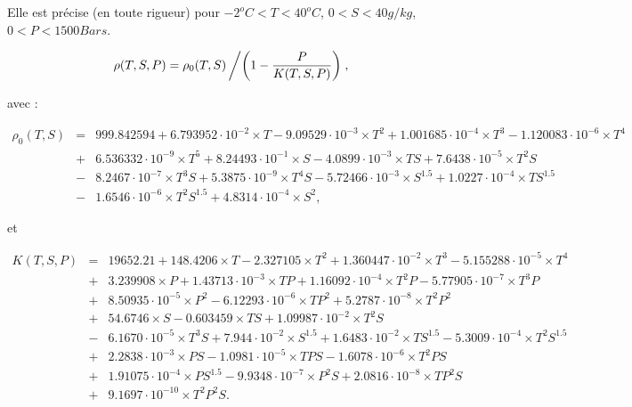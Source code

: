 Elle est précise (en toute rigueur) pour $-2^oC<T < 40^o C$, $0<S<40g/kg$, 
$0<P<1500 Bars$.
{
\tiny

$$
\rho(T,S,P) = \rho_0(T,S) \left/ \left( 1 - \frac{P}{K(T,S,P)} \right) \right.,
$$

avec :

\begin{eqnarray*}
\rho_0(T,S) &=& 999.842594+6.793952\cdot 10^{-2} \times T-9.09529\cdot 10^{-3} \times T^2+1.001685\cdot 10^{-4} \times T^3 -1.120083\cdot 10^{-6} \times T^4 \\
            &+& 6.536332\cdot 10^{-9} \times T^5+8.24493\cdot 10^{-1} \times S-4.0899\cdot 10^{-3} \times T S+7.6438\cdot 10^{-5} \times T^2 S \\
	    &-&8.2467\cdot 10^{-7} \times T^3 S + 5.3875\cdot 10^{-9} \times T^4 S-5.72466\cdot 10^{-3} \times S^{1.5}+1.0227\cdot 10^{-4} \times T S^{1.5}\\
	    &-&1.6546\cdot 10^{-6} \times T^2 S^{1.5}+4.8314\cdot 10^{-4} \times S^2, 
\end{eqnarray*}

et 

\begin{eqnarray*}
K(T,S,P) &=& 19652.21+148.4206 \times T-2.327105 \times T^2+1.360447\cdot 10^{-2} \times T^3-5.155288\cdot 10^{-5} \times T^4 \\
         &+&3.239908 \times P+1.43713\cdot 10^{-3} \times T P+1.16092\cdot 10^{-4} \times T^2 P-5.77905\cdot 10^{-7} \times T^3 P \\
         &+&8.50935\cdot 10^{-5} \times P^2-6.12293\cdot 10^{-6} \times T P^2+5.2787\cdot 10^{-8} \times T^2 P^2 \\
         &+&54.6746 \times S-0.603459 \times T S+1.09987\cdot 10^{-2} \times T^2 S \\
         &-&6.1670\cdot 10^{-5} \times T^3 S+7.944\cdot 10^{-2} \times S^{1.5}+1.6483\cdot 10^{-2} \times T S^{1.5}-5.3009\cdot 10^{-4} \times T^2 S^{1.5} \\
         &+&2.2838\cdot 10^{-3} \times P S-1.0981\cdot 10^{-5} \times T P S-1.6078\cdot 10^{-6} \times T^2 P S \\
	 &+&1.91075\cdot 10^{-4} \times P  S^{1.5}-9.9348\cdot 10^{-7} \times P^2 S+2.0816\cdot 10^{-8} \times T P^2 S \\
	 &+&9.1697\cdot 10^{-10} \times T^2 P^2 S.
\end{eqnarray*}

}


